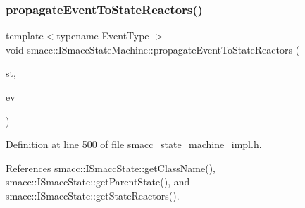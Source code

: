 \subsubsection{\texorpdfstring{propagate\+Event\+To\+State\+Reactors()}{propagateEventToStateReactors()}}
{\footnotesize\ttfamily template$<$typename Event\+Type $>$ \\
void smacc\+::\+I\+Smacc\+State\+Machine\+::propagate\+Event\+To\+State\+Reactors (\begin{DoxyParamCaption}\item[{\hyperlink{classsmacc_1_1ISmaccState}{I\+Smacc\+State} $\ast$}]{st,  }\item[{Event\+Type $\ast$}]{ev }\end{DoxyParamCaption})\hspace{0.3cm}{\ttfamily [private]}}



Definition at line 500 of file smacc\+\_\+state\+\_\+machine\+\_\+impl.\+h.



References smacc\+::\+I\+Smacc\+State\+::get\+Class\+Name(), smacc\+::\+I\+Smacc\+State\+::get\+Parent\+State(), and smacc\+::\+I\+Smacc\+State\+::get\+State\+Reactors().


